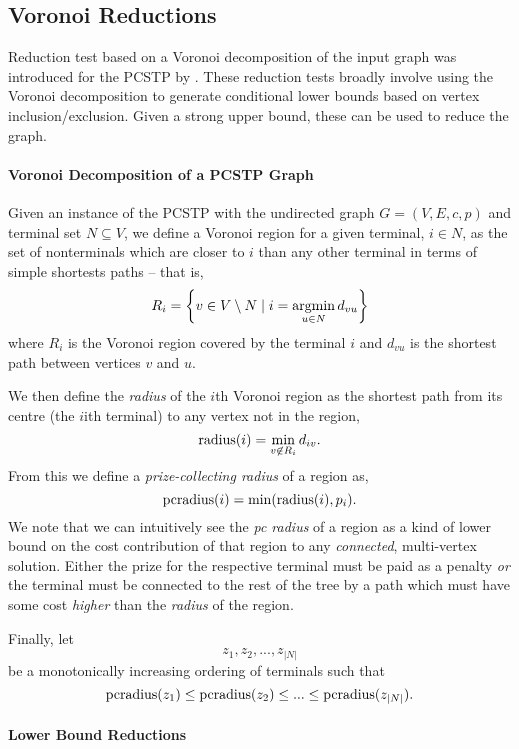 \subsection{Voronoi Reductions}

Reduction test based on a Voronoi decomposition of the input graph was introduced for the PCSTP by \cite{rehfeldt2016reduction}. These reduction tests broadly
involve using the Voronoi decomposition to generate conditional lower bounds based on vertex inclusion/exclusion. Given a strong upper bound, these can be used
to reduce the graph.

\paragraph{Voronoi Decomposition of a PCSTP Graph}

Given an instance of the PCSTP with the undirected graph $G = (V, E, c, p)$ and terminal set
$N \subseteq V$, we define a Voronoi region for a given terminal, $i \in N$, as the set of nonterminals
which are closer to $i$ than any other terminal in terms of simple shortests paths -- that is,
$$R_i = \left\{v \in V \setminus N \mid i = \operatorname*{argmin}_{u \in N} d_{vu}\right\}$$
where $R_i$ is the Voronoi region covered by the terminal $i$ and $d_{vu}$ is the shortest path between vertices
$v$ and $u$.

We then define the \textit{radius} of the $i$th Voronoi region as the shortest path from its centre (the $i$ith terminal)
to any vertex not in the region,
$$\operatorname{radius}(i) = \min_{v \not\in R_i} d_{iv}\mathnormal{.}$$
From this we define a \textit{prize-collecting radius} of a region as,
$$\operatorname{pcradius}(i) = \min(\operatorname{radius}(i), p_i)\mathnormal{.}$$
We note that we can intuitively see the \textit{pc radius} of a region as a kind of lower bound
on the cost contribution
 of that region to any
 \textit{connected}, multi-vertex solution. Either the prize for the respective terminal must be paid as a penalty
 \textit{or} the terminal must be connected to the rest of the tree by a path which must have some cost \textit{higher}
 than the \textit{radius} of the region.

 Finally, let
 $$z_1, z_2, ..., z_{|N|}$$
 be a monotonically increasing ordering of terminals such that
$$\operatorname{pcradius}(z_1) \leq \operatorname{pcradius}(z_2) \leq ... \leq \operatorname{pcradius}(z_{|N|})\mathnormal{.}$$

\paragraph{Lower Bound Reductions}

